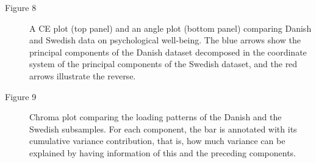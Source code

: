 \documentclass[]{interact}
\theoremstyle{plain}%
\theoremstyle{definition}
\theoremstyle{remark}
\begin{document}
\begin{description}
\item[Figure 8] A CE plot (top panel) and an angle plot (bottom panel) comparing Danish and Swedish data on psychological well-being. The blue arrows show the principal components of the Danish dataset decomposed in the coordinate system of the principal components of the Swedish dataset, and the red arrows illustrate the reverse.
\item[Figure 9] Chroma plot comparing the loading patterns of the Danish and the Swedish subsamples. For each component, the bar is annotated with its cumulative variance contribution, that is, how much variance can be explained by having information of this and the preceding components.
\end{description}
\end{document}
